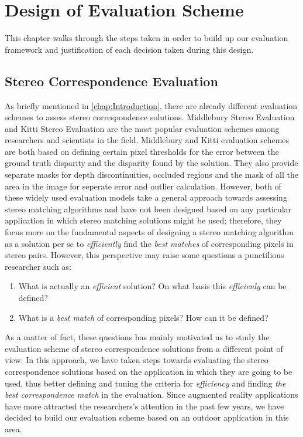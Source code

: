 \chapter{Design of Evaluation Scheme}
\label{chap:System}

This chapter walks through the steps taken in order to build up our evaluation framework and justification of each decision taken during this design.

\section{Stereo Correspondence Evaluation}

As briefly mentioned in \ref{chap:Introduction}, there are already different evaluation schemes to assess stereo correspondence solutions. Middlebury Stereo Evaluation \cite{mideval} and 
Kitti Stereo Evaluation \cite{kitti} are the most popular evaluation schemes among researchers and scientists in the field. 
Middlebury and Kitti evaluation schemes are both based on defining certain pixel thresholds for the error between the ground truth disparity and the disparity found by the solution. 
They also provide separate masks for depth discontinuities, occluded regions and the mask of all the area in the image for seperate error and outlier calculation.
However, both of these widely used evaluation models take a general approach towards assessing stereo matching algorithms and have not been designed based on any particular application in which 
stereo matching solutions might be used; therefore, they focus more on the fundamental aspects of designing a stereo matching algorithm as a solution per se to \textit{efficiently}
find the \textit{best matches} of corresponding pixels in stereo pairs. 
However, this perspective may raise some questions a punctilious researcher such as:

\begin{enumerate}
\item What is actually an \textit{efficient} solution? On what basis this \textit{efficienly} can be defined?
\item What is a \textit{best match} of corresponding pixels? How can it be defined?
\end{enumerate}

As a matter of fact, these questions has mainly motivated us to study the evaluation scheme of stereo correspondence solutions from a different point of view. 
In this approach, we have taken steps towards evaluating the stereo correspondence solutions based on the application in which they are going to be used, 
thus better defining and tuning the criteria for \textit{efficiency} and 
finding \textit{the best correspondence match} in the evaluation. Since augmented reality applications have more attracted the researchers's attention in the past few years, 
we have decided to build our evaluation scheme based on an outdoor application in this area.


